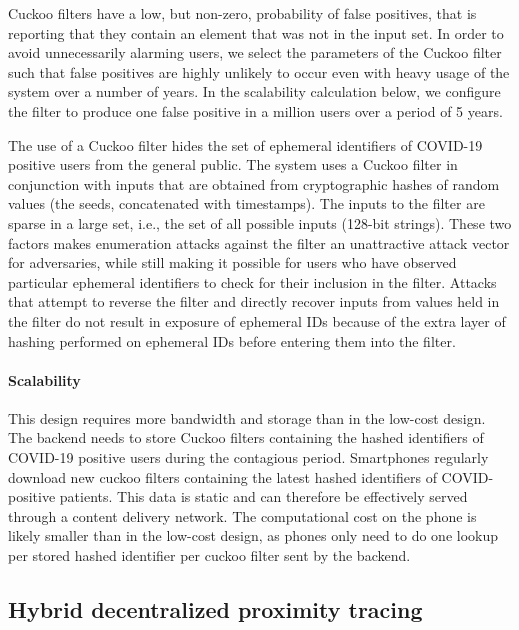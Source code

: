 \documentclass{article}
\begin{document}
Cuckoo filters have a low, but non-zero, probability of false positives,
that is reporting that they contain an element that was not in the input
set. In order to avoid unnecessarily alarming users, we select the
parameters of the Cuckoo filter such that false positives are highly
unlikely to occur even with heavy usage of the system over a number of
years. In the scalability calculation below, we configure the filter to
produce one false positive in a million users over a period of 5 years.

The use of a Cuckoo filter hides the set of ephemeral identifiers of
COVID-19 positive users from the general public. The system uses a
Cuckoo filter in conjunction with inputs that are obtained from
cryptographic hashes of random values (the seeds, concatenated with
timestamps). The inputs to the filter are sparse in a large set, i.e.,
the set of all possible inputs (128-bit strings). These two factors
makes enumeration attacks against the filter an unattractive attack
vector for adversaries, while still making it possible for users who
have observed particular ephemeral identifiers to check for their
inclusion in the filter. Attacks that attempt to reverse the filter and
directly recover inputs from values held in the filter do not result in
exposure of ephemeral IDs because of the extra layer of hashing
performed on ephemeral IDs before entering them into the filter.

\hypertarget{scalability-1}{%
\paragraph{Scalability}\label{scalability-1}}

This design requires more bandwidth and storage than in the low-cost
design. The backend needs to store Cuckoo filters containing the hashed
identifiers of COVID-19 positive users during the contagious period.
Smartphones regularly download new cuckoo filters containing the latest
hashed identifiers of COVID-positive patients. This data is static and
can therefore be effectively served through a content delivery network.
The computational cost on the phone is likely smaller than in the
low-cost design, as phones only need to do one lookup per stored hashed
identifier per cuckoo filter sent by the backend.

\hypertarget{hybrid-decentralized-proximity-tracing}{%
\subsection{Hybrid decentralized proximity
tracing}\label{hybrid-decentralized-proximity-tracing}}
\end{document}

